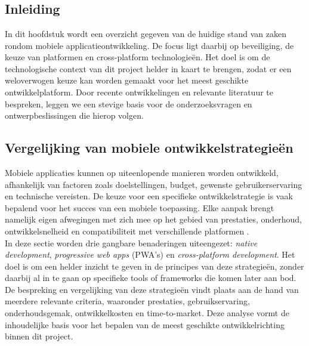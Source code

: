 \chapter{}
\label{ch:stand-van-zaken}

\section{Inleiding}
In dit hoofdstuk wordt een overzicht gegeven van de huidige stand van zaken rondom mobiele applicatieontwikkeling. De focus ligt daarbij op beveiliging, de keuze van platformen en cross-platform technologieën. Het doel is om de technologische context van dit project helder in kaart te brengen, zodat er een weloverwogen keuze kan worden gemaakt voor het meest geschikte ontwikkelplatform. Door recente ontwikkelingen en relevante literatuur te bespreken, leggen we een stevige basis voor de onderzoeksvragen en ontwerpbeslissingen die hierop volgen.

\section{Vergelijking van mobiele ontwikkelstrategieën}

Mobiele applicaties kunnen op uiteenlopende manieren worden ontwikkeld, afhankelijk van factoren zoals doelstellingen, budget, gewenste gebruikerservaring en technische vereisten. De keuze voor een specifieke ontwikkelstrategie is vaak bepalend voor het succes van een mobiele toepassing. Elke aanpak brengt namelijk eigen afwegingen met zich mee op het gebied van prestaties, onderhoud, ontwikkelsnelheid en compatibiliteit met verschillende platformen \autocite{Sharma2025}.\\

In deze sectie worden drie gangbare benaderingen uiteengezet: \textit{native development}, \textit{progressive web apps} (PWA’s) en \textit{cross-platform development}. Het doel is om een helder inzicht te geven in de principes van deze strategieën, zonder daarbij al in te gaan op specifieke tools of frameworks die komen later aan bod.\\

De bespreking en vergelijking van deze strategieën vindt plaats aan de hand van meerdere relevante criteria, waaronder prestaties, gebruikservaring, onderhoudsgemak, ontwikkelkosten en time-to-market. Deze analyse vormt de inhoudelijke basis voor het bepalen van de meest geschikte ontwikkelrichting binnen dit project.




